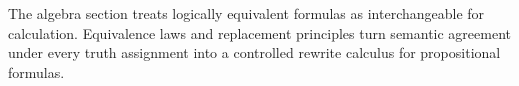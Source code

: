 \begin{remark*}[Exposition]
The algebra section treats logically equivalent formulas as interchangeable
for calculation. Equivalence laws and replacement principles turn semantic
agreement under every truth assignment into a controlled rewrite calculus for
propositional formulas.
\end{remark*}
